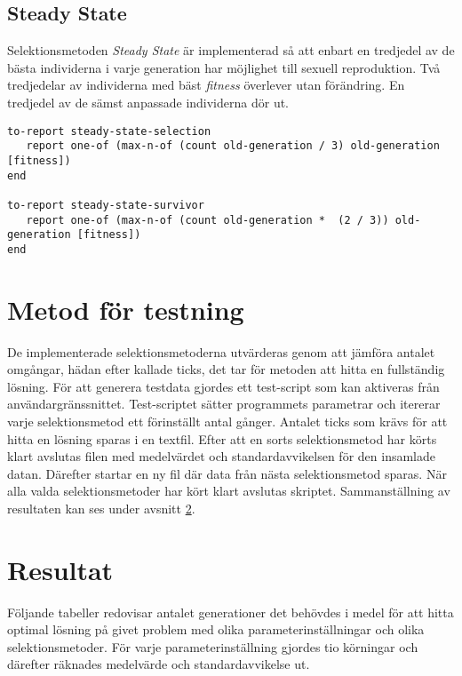 \documentclass[titlepage, a4paper, 12pt]{article}
\begin{document}
\subsection{Steady State}
Selektionsmetoden \textit{Steady State} är implementerad så att enbart
en tredjedel av de bästa individerna i varje generation har möjlighet
till sexuell reproduktion. Två tredjedelar av individerna med bäst
\textit{fitness} överlever utan förändring. En tredjedel av de sämst
anpassade individerna dör ut.

\begin{kod}[H]
  \begin{scriptsize}
\begin{verbatim}
to-report steady-state-selection
   report one-of (max-n-of (count old-generation / 3) old-generation [fitness])
end

to-report steady-state-survivor
   report one-of (max-n-of (count old-generation *  (2 / 3)) old-generation [fitness])
end
\end{verbatim}
  \end{scriptsize}
\end{kod}

\section{Metod för testning}
De implementerade selektionsmetoderna utvärderas genom att jämföra
antalet omgångar, hädan efter kallade ticks, det tar för metoden att
hitta en fullständig lösning. För att generera testdata gjordes ett
test-script som kan aktiveras från användargränssnittet. Test-scriptet
sätter programmets parametrar och itererar varje selektionsmetod ett
förinställt antal gånger. Antalet ticks som krävs för att hitta en
lösning sparas i en textfil. Efter att en sorts selektionsmetod har
körts klart avslutas filen med medelvärdet och standardavvikelsen för
den insamlade datan. Därefter startar en ny fil där data från nästa
selektionsmetod sparas. När alla valda selektionsmetoder har kört
klart avslutas skriptet. Sammanställning av resultaten kan ses under
avsnitt \ref{sec:resultat}.

\section{Resultat}\label{sec:resultat}
Följande tabeller redovisar antalet generationer det behövdes i medel
för att hitta optimal lösning på givet problem med olika
parameterinställningar och olika selektionsmetoder. För varje
parameterinställning gjordes tio körningar och därefter räknades
medelvärde och standardavvikelse ut.
\end{document}
